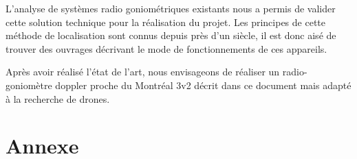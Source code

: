\documentclass[a4paper, 11pt, oneside]{memoir}
\newcounter{th}[chapter]
\begin{document}
L'analyse de systèmes radio goniométriques existants nous a permis de valider cette solution technique pour la réalisation du projet. Les principes de cette méthode de localisation sont connus depuis près d'un siècle, il est donc aisé de trouver des ouvrages décrivant le mode de fonctionnements de ces appareils.

Après avoir réalisé l'état de l'art, nous envisageons de réaliser un radio-goniomètre doppler proche du Montréal 3v2 décrit dans ce document mais adapté à la recherche de drones.   

\newpage


\part*{Annexe}
\appendix




\newpage
\listoffigures
\printindex

\end{document}
